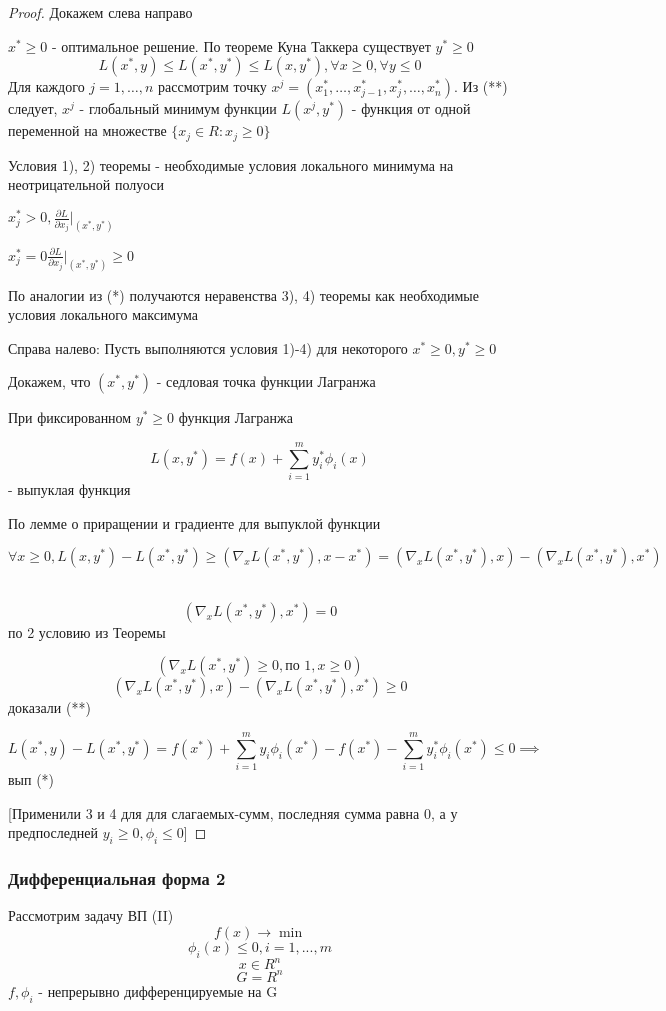\documentclass[a4paper]{article}
\theoremstyle{definition}
\theoremstyle{remark}
\begin{document}
\begin{proof}
    Докажем слева направо 

    $x^*\ge 0$ - оптимальное решение. По теореме Куна Таккера существует $y^*\ge 0$
    \[L(x^*, y) \le L(x^*, y^*)\le L(x, y^*), \forall x\ge0, \forall y \le 0\]
    Для каждого $j = 1, \dots, n$ рассмотрим точку $x^j = (x_1^*,\dots, x_{j-1}^*, x_j^*, \dots, x_n^*)$. Из (**) следует, $x^j$ - глобальный минимум функции $L(x^j, y^*)$ - функция от одной переменной на множестве $ \{x_j\in R: x_j \ge 0\}$
    
    Условия 1), 2) теоремы - необходимые условия локального минимума на неотрицательной полуоси

    $x_j^* > 0, \frac{\partial L}{\partial x_j}|_{(x^*, y^*)}$

    $x_j^* = 0 \frac{\partial L}{\partial x_j}|_{(x^*, y^*)} \ge 0 $

    По аналогии из (*) получаются неравенства 3), 4) теоремы как необходимые условия локального максимума

    Справа налево: Пусть выполняются условия 1)-4) для некоторого $x^*\ge 0, y^*\ge 0$

    Докажем, что $(x^*, y^*)$ - седловая точка функции Лагранжа
    
    При фиксированном $y^*\ge 0 $ функция Лагранжа

    \[L(x, y^*) = f(x) + \sum_{i = 1}^m y_i^* \phi_i(x)\] - выпуклая функция

    По лемме о приращении и градиенте для выпуклой функции 

    \[\forall x\ge0, L(x, y^*) - L(x^*, y^*)\ge (\nabla_x L(x^*, y^*), x-x^*) = (\nabla_x L(x^*, y^*), x) - (\nabla_x L(x^*, y^*), x^*)\]\

    \[(\nabla_x L(x^*, y^*), x^*) = 0\] по 2 условию из Теоремы
    
    \[(\nabla_x L(x^*, y^*)\ge0, \text{по 1}, x\ge 0)\]
    \[(\nabla_x L(x^*, y^*), x) - (\nabla_x L(x^*, y^*), x^*) \ge 0\]
    доказали (**)

    \[L(x^*,  y) - L(x^*, y^*) = f(x^*) +\sum_{i=1}^{m}y_i \phi_i(x^*) - f(x^*) - \sum_{i= 1}^m y_i^* \phi_i(x^*) \le 0 \implies\]
    вып (*)

    [Применили 3 и 4 для для слагаемых-сумм, последняя сумма равна 0, а у предпоследней $y_i\ge0, \phi_i\le 0$]
\end{proof}
\subsubsection{Дифференциальная форма 2}
Рассмотрим задачу ВП (II)
\[f(x)\to \min\]
\[\phi_i(x)\le 0, i = 1, ..., m\]
\[x\in R^n\]
\[G = R^n\]
$f, \phi_i$ - непрерывно дифференцируемые на G
\end{document}
